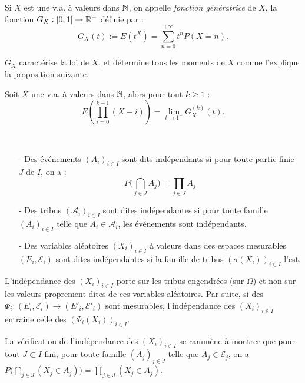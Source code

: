 \documentclass[11pt,a4paper]{article}
\begin{document}
\begin{definstar}
Si $X$ est une v.a. à valeurs dans $\mathbb N$, on appelle \textit{fonction génératrice} de $X$, la fonction $G_X : [0,1] \to \mathbb R^+$ définie par : \[G_X(t) := E(t^X) = \sum_{n=0}^{+\infty} t^nP(X=n).\]
\end{definstar}

\begin{rmq}
$G_X$ caractérise la loi de $X$, et détermine tous les moments de $X$ comme l'explique la proposition suivante.
\end{rmq}

\begin{propstar}
Soit $X$ une v.a. à valeurs dans $\mathbb N$, alors pour tout $k\geq 1$ :\[E\left(\prod_{i=0}^{k-1}(X-i)\right) = \lim_{t\to 1^-}G_X^{(k)}(t).\]
\end{propstar}

\begin{definstar}[Indépendance]~
\begin{itemize}
\item[-] Des événements $(A_i)_{i\in I}$  sont dits indépendants si pour toute partie finie $J$ de $I$, on a : \[P\Big(\bigcap_{j\in J}A_j\Big)=\prod_{j\in J}A_j\]
\item[-] Des tribus  $(\mathcal{A}_i)_{i\in I}$  sont dites indépendantes si pour toute famille $(A_i)_{i\in I}$ telle que $A_i\in \mathcal{A}_i$, les événements sont indépendants.
\item[-] Des variables aléatoires $(X_i)_{i\in I}$  à valeurs dans des espaces mesurables $(E_i,\mathcal{E}_i)$ sont dites indépendantes si la famille de tribus $(\sigma(X_i))_{i\in I}$ l'est.
\end{itemize}
\end{definstar}

\begin{rmq}
L'indépendance des $(X_i)_{i\in I}$ porte sur les tribus engendrées (sur $\Omega$) et non sur les
valeurs proprement dites de ces variables aléatoires. Par suite, si des $\Phi_i : (E_i,\mathcal{E}_i) \to (E'_i,\mathcal{E}'_i)$ sont mesurables, l'indépendance des $(X_i)_{i\in I}$ entraine celle des $(\Phi_i(X_i))_{i\in I}$.
\end{rmq}

\begin{rmq}
La vérification de l'indépendance des $(X_i)_{i\in I}$ se rammène à montrer que pour tout $J\subset I$ fini, pour toute famille $(A_j)_{j\in J}$ telle que $A_j\in \mathcal{E}_j$, on a $\displaystyle P\Big(\bigcap_{j\in J}(X_j\in A_j )\Big)=\prod_{j\in J}(X_j \in A_j)$.
\end{rmq}
\end{document}
